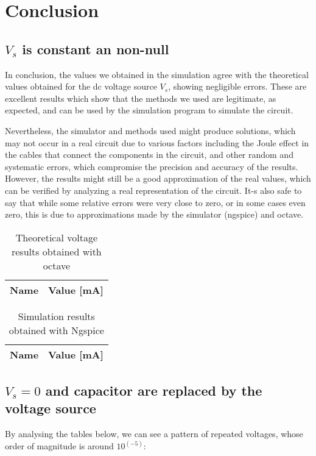 \section{Conclusion}
\label{sec:conclusion}
\subsection{$V_s$ is constant an non-null}

	In conclusion, the values we obtained in the simulation agree with the theoretical values obtained for the dc voltage source $V_s$, showing negligible errors. These are excellent results which show that the methods we used are legitimate, as expected, and can be used by the simulation program to simulate the circuit.
	
Nevertheless, the simulator and methods used might produce solutions, which may not occur in a real circuit due to various factors including the Joule effect in the cables that connect the components in the circuit, and other random and systematic errors, which compromise the precision and accuracy of the results. However, the results might still be a good approximation of the real values, which can be verified by analyzing a real representation of the circuit. It-s also safe to say that while some relative errors were very close to zero, or in some cases even zero, this is due to approximations made by the simulator (ngspice) and octave.

\begin{table}[!h]
	\centering
	\begin{tabular}{|l|r|}
		\hline    
		{\bf Name} & {\bf Value [mA]} \\ \hline
		
	\end{tabular}
	\caption{Theoretical voltage results obtained with octave}
	\label{tab:op}
\end{table}

\begin{table}[!h]
	\centering
	\begin{tabular}{|l|r|}
		\hline    
		{\bf Name} & {\bf Value [mA]} \\ \hline
		
	\end{tabular}
	\caption{Simulation results obtained with Ngspice}
	\label{tab:op}
\end{table}

\subsection{$V_s = 0$ and capacitor are replaced by the voltage source}
By analysing the tables below, we can see a pattern of repeated voltages, whose order of magnitude is around $10^(-5)$:

